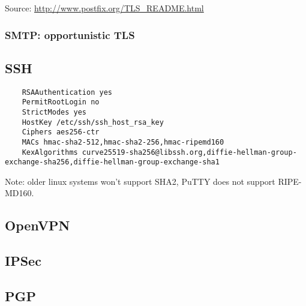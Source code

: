 Source: \url{http://www.postfix.org/TLS_README.html}

\subsubsection{SMTP: opportunistic TLS}



\subsection{SSH}


\begin{verbatim}
	RSAAuthentication yes
	PermitRootLogin no
	StrictModes yes
	HostKey /etc/ssh/ssh_host_rsa_key
	Ciphers aes256-ctr
	MACs hmac-sha2-512,hmac-sha2-256,hmac-ripemd160
	KexAlgorithms curve25519-sha256@libssh.org,diffie-hellman-group-exchange-sha256,diffie-hellman-group-exchange-sha1
\end{verbatim}

Note: older linux systems won't support SHA2, PuTTY does not support RIPE-MD160.

\subsection{OpenVPN}


\subsection{IPSec}

\subsection{PGP}




